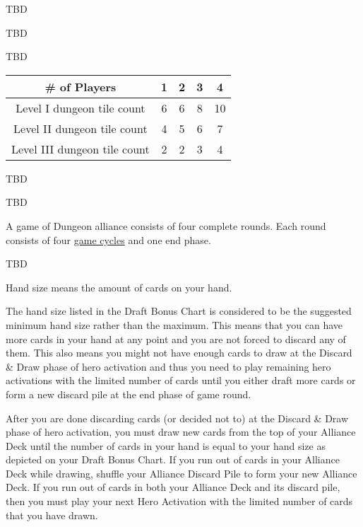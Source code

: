 TBD

TBD

TBD

\begin{table}
\centering
\begin{tabular}{ccccc}
\toprule
# of Players & 1 & 2 & 3 & 4 \\
\midrule
Level I dungeon tile count & 6 & 6 & 8 & 10 \\
Level II dungeon tile count & 4 & 5 & 6 & 7 \\
Level III dungeon tile count & 2 & 2 & 3 & 4 \\
\bottomrule
\end{tabular}
\end{table}

TBD





TBD

A game of Dungeon alliance consists of four complete rounds. Each round consists of four \hyperref[sec:Gamecycle]{game cycles} and one end phase.


TBD


Hand size means the amount of cards on your hand. 

The hand size listed in the Draft Bonus Chart is considered to be the suggested minimum hand size rather than the maximum. This means that you can have more cards in your hand at any point and you are not forced to discard any of them. This also means you might not have enough cards to draw at the Discard & Draw phase of hero activation and thus you need to play remaining hero activations with the limited number of cards until you either draft more cards or form a new discard pile at the end phase of game round.

After you are done discarding cards (or decided not to) at the Discard & Draw phase of hero activation, you must draw new cards from the top of your Alliance Deck until the number of cards in your hand is equal to your hand size as depicted on your Draft Bonus Chart. If you run out of cards in your Alliance Deck while drawing, shuffle your Alliance Discard Pile to form your new Alliance Deck. If you run out of cards in both your Alliance Deck and its discard pile, then you must play your next Hero Activation with the limited number of cards that you have drawn.

